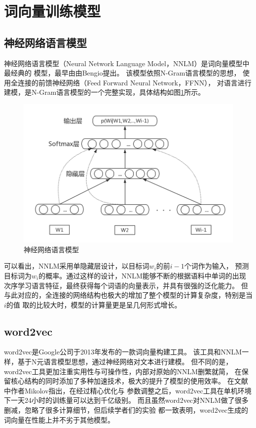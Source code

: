 \section{词向量训练模型}
\subsection{神经网络语言模型}
神经网络语言模型（Neural Network Language Model，NNLM）是词向量模型中最经典的
模型，最早由由Bengio提出。
该模型依照N-Gram语言模型的思想，
使用全连接的前馈神经网络（Feed Forward Neural Network，FFNN），
对语言进行建模，是N-Gram语言模型的一个完整实现，具体结构如图\ref{nnlm}所示。
\begin{figure}[h]
    \includegraphics[scale=0.5]{picture/nnlm.png}
    \caption{神经网络语言模型}
    \label{nnlm}
\end{figure}

可以看出，NNLM采用单隐藏层设计，以目标词$w_i$的前$i-1$个词作为输入，
预测目标词为$w_i$的概率。通过这样的设计，NNLM能够不断的根据语料中单词的出现
次序学习语言特征，最终获得每个词语的向量表示，并具有很强的泛化能力。
但与此对应的，全连接的网络结构也极大的增加了整个模型的计算复杂度，特别是当$i$的值
取的比较大时，模型的计算量更是呈几何形式增长。

\subsection{word2vec}
\label{sect_word2vec}
word2vec是Google公司于2013年发布的一款词向量构建工具。
该工具和NNLM一样，基于N元语言模型思想，通过神经网络对文本进行建模。
但不同的是，word2vec工具更加注重实用性与可操作性，内部对原始的NNLM删繁就简，
在保留核心结构的同时添加了多种加速技术，极大的提升了模型的使用效率。
在文献\cite{mikolov2013distributed}中作者Mikolov指出，在经过精心优化与
参数调整之后，word2vec工具在单机环境下一天24小时的训练量可以达到千亿级别。
而且虽然word2vec对NNLM做了很多删减，忽略了很多计算细节，但后续学者们的实验
都一致表明，word2vec生成的词向量在性能上并不劣于其他模型。

